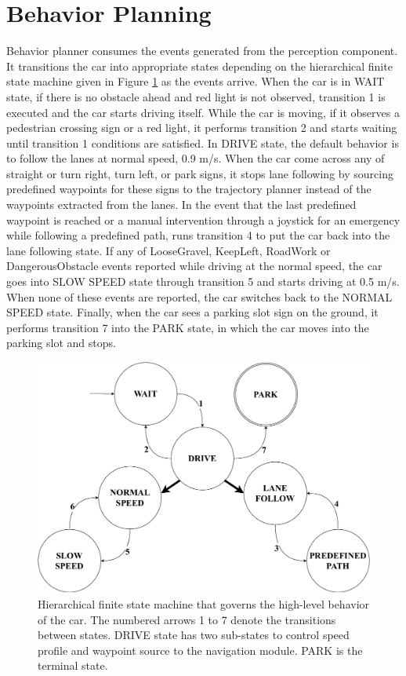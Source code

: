 \section{Behavior Planning}

Behavior planner consumes the events generated from the perception component.
It transitions the car into appropriate states depending on the hierarchical
finite state machine given in Figure \ref{figure:hfsm} as the events arrive.
When the car is in WAIT state, if there is no obstacle ahead and red light is
not observed, transition 1 is executed and the car starts driving itself. While
the car is moving, if it observes a pedestrian crossing sign or a red light, it
performs transition 2 and starts waiting until transition 1 conditions are
satisfied. In DRIVE state, the default behavior is to follow the lanes at
normal speed, 0.9 m/s. When the car come across any of straight or turn right,
turn left, or park signs, it stops lane following by sourcing predefined
waypoints for these signs to the trajectory planner instead of the waypoints
extracted from the lanes. In the event that the last predefined waypoint is
reached or a manual intervention through a joystick for an emergency while
following a predefined path, runs transition 4 to put the car back into the
lane following state. If any of LooseGravel, KeepLeft, RoadWork or
DangerousObstacle events reported while driving at the normal speed, the car
goes into SLOW SPEED state through transition 5 and starts driving at 0.5 m/s.
When none of these events are reported, the car switches back to the NORMAL
SPEED state. Finally, when the car sees a parking slot sign on the ground, it
performs transition 7 into the PARK state, in which the car moves into the
parking slot and stops.

\begin{figure}[h]
\centering
\includegraphics[width=.8\textwidth]{figures/hfsm.pdf}
\caption[Hierarchical finite state machine]{Hierarchical finite state machine
  that governs the high-level behavior of the car. The numbered arrows 1 to 7
  denote the transitions between states.  DRIVE state has two sub-states to
  control speed profile and waypoint source to the navigation module. PARK is
  the terminal state.}
\label{figure:hfsm}
\end{figure}
